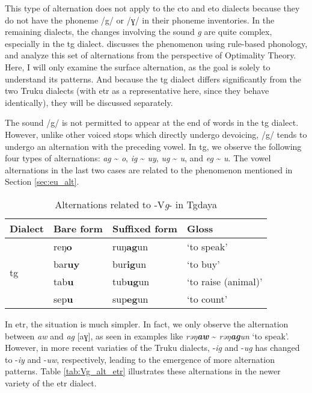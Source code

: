 This type of alternation does not apply to the \acl{cto} and \acl{eto} dialects because they do not have the phoneme /g/ or /ɣ/ in their phoneme inventories. In the remaining dialects, the changes involving the sound \textit{g} are quite complex, especially in the \acl{tg} dialect. \textcite[653-57]{yang1976sedpho} discusses the phenomenon using rule-based phonology, and \textcite{songandpan2024g} analyze this set of alternations from the perspective of Optimality Theory. Here, I will only examine the surface alternation, as the goal is solely to understand its patterns. And because the \acl{tg} dialect differs significantly from the two Truku dialects (with \acl{etr} as a representative here, since they behave identically), they will be discussed separately.

The sound /g/ is not permitted to appear at the end of words in the \acl{tg} dialect. However, unlike other voiced stops which directly undergo devoicing, /g/ tends to undergo an alternation with the preceding vowel. In \acl{tg}, we observe the following four types of alternations: \textit{ag} \~{ } \textit{o}, \textit{ig} \~{ } \textit{uy}, \textit{ug} \~{ } \textit{u}, and \textit{eg} \~{ } \textit{u}. The vowel alternations in the last two cases are related to the phenomenon mentioned in Section \ref{sec:eu_alt}.

\begin{table}[!htbp]
\centering
\caption{Alternations related to -V\textit{g}- in Tgdaya}
\label{tab:Vg_alt_tg}
\begin{tabular}{llll}
\hline
Dialect                   & Bare form      & Suffixed form    & Gloss      \\ \hline
\multirow{4}{*}{\acl{tg}} & reŋ\textbf{o}  & ruŋ\textbf{ag}un & `to speak'          \\
                          & bar\textbf{uy} & bur\textbf{ig}un & `to buy'            \\
                          & tab\textbf{u} & tub\textbf{ug}un & `to raise (animal)' \\
                          & sep\textbf{u} & sup\textbf{eg}un & `to count'          \\ \hline
\end{tabular}
\end{table}

In \acl{etr}, the situation is much simpler. In fact, we only observe the alternation between \textit{aw} and \textit{ag} [aɣ], as seen in examples like \textit{rəŋ\textbf{aw}} \~{} \textit{rəŋ\textbf{ag}un} `to speak'. However, in more recent variaties of the Truku dialects, -\textit{ig} and -\textit{ug} has changed to -\textit{iy} and -\textit{uw}, respectively, leading to the emergence of more alternation patterns. Table \ref{tab:Vg_alt_etr} illustrates these alternations in the newer variety of the \acl{etr} dialect.

